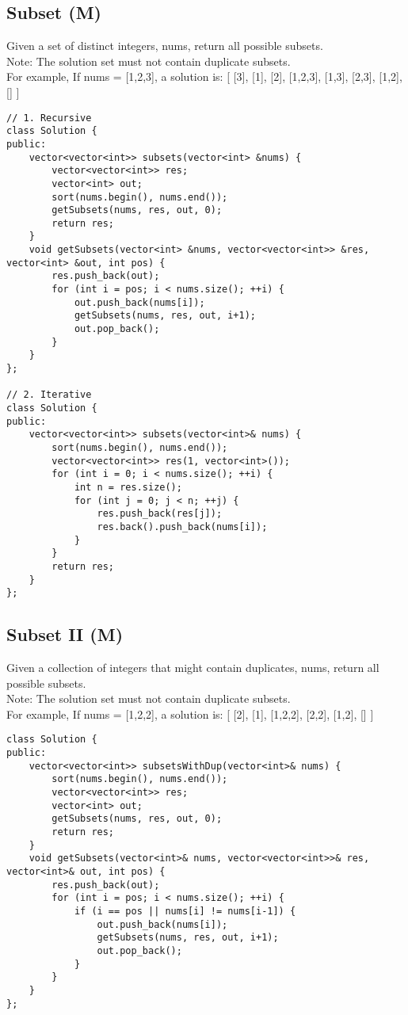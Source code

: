 \subsection{Subset (M)}
Given a set of distinct integers, nums, return all possible subsets.\\
Note: The solution set must not contain duplicate subsets.\\
For example,
If nums = [1,2,3], a solution is:
[
  [3],
  [1],
  [2],
  [1,2,3],
  [1,3],
  [2,3],
  [1,2],
  []
]\\

\begin{lstlisting}
// 1. Recursive
class Solution {
public:
    vector<vector<int>> subsets(vector<int> &nums) {
        vector<vector<int>> res;
        vector<int> out;
        sort(nums.begin(), nums.end());
        getSubsets(nums, res, out, 0);
        return res;
    }
    void getSubsets(vector<int> &nums, vector<vector<int>> &res, vector<int> &out, int pos) {
        res.push_back(out);
        for (int i = pos; i < nums.size(); ++i) {
            out.push_back(nums[i]);
            getSubsets(nums, res, out, i+1);
            out.pop_back();
        }
    }
};

// 2. Iterative
class Solution {
public:
    vector<vector<int>> subsets(vector<int>& nums) {
        sort(nums.begin(), nums.end());
        vector<vector<int>> res(1, vector<int>());
        for (int i = 0; i < nums.size(); ++i) {
            int n = res.size();
            for (int j = 0; j < n; ++j) {
                res.push_back(res[j]);
                res.back().push_back(nums[i]);
            }
        }
        return res;
    }
};
\end{lstlisting}


\subsection{Subset II (M)}
Given a collection of integers that might contain duplicates, nums, return all possible subsets.\\
Note: The solution set must not contain duplicate subsets.\\
For example,
If nums = [1,2,2], a solution is:
[
  [2],
  [1],
  [1,2,2],
  [2,2],
  [1,2],
  []
]\\

\begin{lstlisting}
class Solution {
public:
    vector<vector<int>> subsetsWithDup(vector<int>& nums) {
        sort(nums.begin(), nums.end());
        vector<vector<int>> res;
        vector<int> out;
        getSubsets(nums, res, out, 0);
        return res;
    }
    void getSubsets(vector<int>& nums, vector<vector<int>>& res, vector<int>& out, int pos) {
        res.push_back(out);
        for (int i = pos; i < nums.size(); ++i) {
            if (i == pos || nums[i] != nums[i-1]) {
                out.push_back(nums[i]);
                getSubsets(nums, res, out, i+1);
                out.pop_back();
            }
        }
    }
};
\end{lstlisting}


